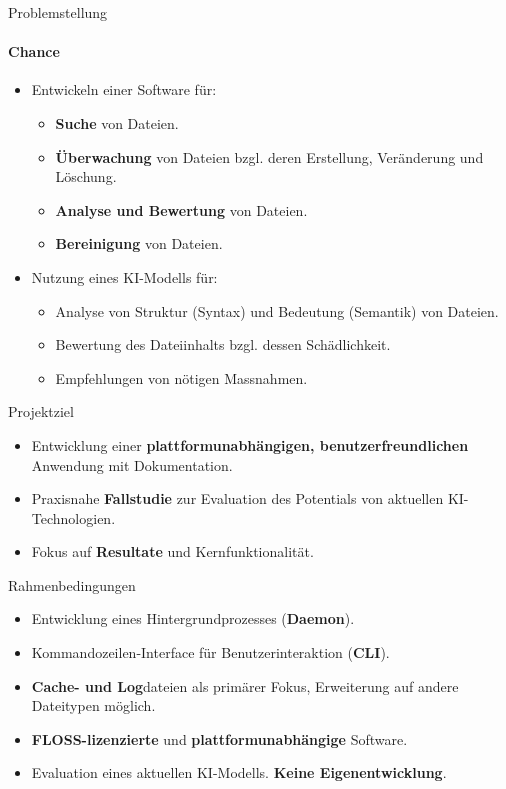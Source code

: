 \documentclass[
	ngerman,%
	authorontitle=true,
	]{bfhbeamer}
\begin{document}
\begin{frame}{Problemstellung}
	\framesubtitle{Chance}
	\begin{itemize}

		\item Entwickeln einer Software f\"ur:
		\begin{itemize}
			\item \textbf{Suche} von Dateien.
			\item \textbf{\"Uberwachung} von Dateien bzgl. deren Erstellung, Ver\"anderung und L\"oschung.
			\item \textbf{Analyse und Bewertung} von Dateien.
			\item \textbf{Bereinigung} von Dateien.
		\end{itemize}
		\item Nutzung eines KI-Modells f\"ur:
		\begin{itemize}
			\item Analyse von Struktur (Syntax) und Bedeutung (Semantik) von Dateien.
			\item Bewertung des Dateiinhalts bzgl.
			dessen Schädlichkeit.
			\item Empfehlungen von n\"otigen Massnahmen.
		\end{itemize}
	\end{itemize}
\end{frame}

\begin{frame}{Projektziel}
	\begin{itemize}
		\item Entwicklung einer \textbf{plattformunabh\"angigen, benutzerfreundlichen} Anwendung mit Dokumentation.
		\item Praxisnahe \textbf{Fallstudie} zur Evaluation des Potentials von aktuellen KI-Technologien.
		\item Fokus auf \textbf{Resultate} und Kernfunktionalit\"at.
	\end{itemize}
\end{frame}

\begin{frame}{Rahmenbedingungen}
	\begin{itemize}
		\item Entwicklung eines Hintergrundprozesses (\textbf{Daemon}).
		\item Kommandozeilen-Interface f\"ur Benutzerinteraktion (\textbf{CLI}).
		\item \textbf{Cache- und Log}dateien als prim\"arer Fokus, Erweiterung auf andere Dateitypen m\"oglich.
		\item \textbf{FLOSS-lizenzierte} und \textbf{plattformunabh\"angige} Software.
		\item Evaluation eines aktuellen KI-Modells. \textbf{Keine Eigenentwicklung}.
	\end{itemize}
\end{frame}
\end{document}
